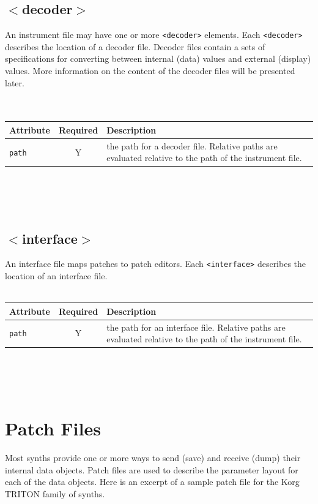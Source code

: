 \documentclass[a4paper,twoside,12pt]{article}
\newcommand{\code}[1]{\color{red}\texttt{#1}\color{black}}
\begin{document}
\subsection{$<$decoder$>$}
An instrument file may have one or more \code{<decoder>}{}
elements. Each \code{<decoder>}{} describes the location of a
decoder file. Decoder files contain a sets of specifications for
converting between internal (data) values and external (display)
values. More information on the content of the decoder files will
be presented later.\\
\\
\\
\begin{tabular}{|l|c|p{9cm}|}
\hline
Attribute & Required & Description \\
\hline \code{path} & Y & the path for a decoder file. Relative
paths are evaluated relative to the path of the instrument file. \\
\hline
\end{tabular}
\\
\\
\\

\subsection{$<$interface$>$}
An interface file maps patches to patch editors. Each
\code{<interface>}{} describes the location of an interface file.
\\
\\
\begin{tabular}{|l|c|p{9cm}|}
\hline
Attribute & Required & Description \\
\hline \code{path} & Y & the path for an interface file. Relative
paths are evaluated relative to the path of the instrument file. \\
\hline
\end{tabular}
\\
\\
\\

\section{Patch Files}\label{patch_files}
Most synths provide one or more ways to send (save) and receive
(dump) their internal data objects. Patch files are used to
describe the parameter layout for each of the data objects. Here
is an excerpt of a sample patch file for the Korg TRITON family of
synths.
\end{document}
